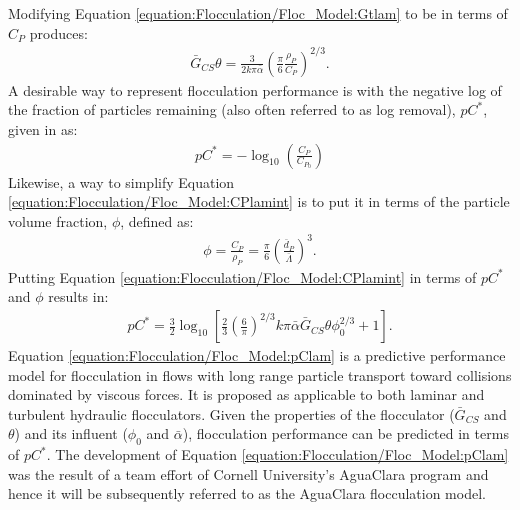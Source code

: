 \documentclass[letterpaper,10pt,english]{sphinxmanual}
\begin{document}
Modifying Equation \eqref{equation:Flocculation/Floc_Model:Gtlam} to be in terms of \(C_P\) produces:
\begin{equation}\label{equation:Flocculation/Floc_Model:GtlamSim}
\begin{split}      \bar G_{CS}\theta = \frac{3}{2k\pi\bar{\alpha}}\left(\frac{\pi}{6}\frac{\rho_P}{C_P}\right)^{2/3}.\end{split}
\end{equation}
A desirable way to represent flocculation performance is with the negative log of the fraction of particles remaining (also often referred to as log removal), \(pC^*\), given in \label{\detokenize{Flocculation/Floc_Model:id7}}{\hyperref[\detokenize{Flocculation/Floc_Model:floc-model-swetland-flocculation-sedimentation-2014}]{\sphinxcrossref{{[}SWSL14{]}}}} as:
\begin{equation}\label{equation:Flocculation/Floc_Model:pC}
\begin{split}      p{C^*}=-\log_{10}\left(\frac{C_{P}}{C_{P_0}}\right)\end{split}
\end{equation}
Likewise, a way to simplify Equation \eqref{equation:Flocculation/Floc_Model:CPlamint} is to put it in terms of the particle volume fraction, \(\phi\), defined as:
\begin{equation}\label{equation:Flocculation/Floc_Model:phi}
\begin{split}      \phi=\frac{C_P}{\rho_P}=\frac{\pi}{6}\left(\frac{\bar{d}_P}{\bar \Lambda}\right)^3.\end{split}
\end{equation}
Putting Equation \eqref{equation:Flocculation/Floc_Model:CPlamint} in terms of \(pC^*\) and
\(\phi\) results in:
\begin{equation}\label{equation:Flocculation/Floc_Model:pClam}
\begin{split}      p{C^*}=\frac{3}{2}\log_{10}\left[\frac{2}{3}\left(\frac{6}{\pi}\right)^{2/3}k\pi\bar{\alpha}\bar G_{CS}\theta\phi_0^{2/3}+1\right].\end{split}
\end{equation}
Equation \eqref{equation:Flocculation/Floc_Model:pClam} is a predictive performance model for flocculation in flows with long range particle transport toward collisions dominated by viscous forces. It is proposed as applicable to both laminar and turbulent hydraulic flocculators. Given the properties of the flocculator (\(\bar G_{CS}\) and \(\theta\)) and its influent (\(\phi_0\) and \(\bar{\alpha}\)), flocculation performance can be predicted in terms of \(pC^*\). The development of Equation \eqref{equation:Flocculation/Floc_Model:pClam} was the result of a team effort of Cornell University’s AguaClara program and hence it will be subsequently referred to as the AguaClara flocculation model.
\end{document}
